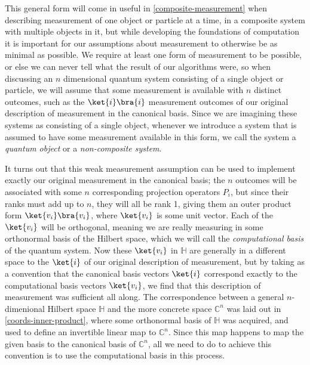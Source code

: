 This general form will come in useful in \autoref{composite-measurement} when describing measurement of one object or particle at a time, in a composite system with multiple objects in it, but while developing the foundations of computation it is important for our assumptions about measurement to otherwise be as minimal as possible. We require at least one form of measurement to be possible, or else we can never tell what the result of our algorithms were, so when discussing an $n$ dimensional quantum system consisting of a single object or particle, we will assume that some measurement is available with $n$ distinct outcomes, such as the $\ket{i}\bra{i}$ measurement outcomes of our original description of measurement in the canonical basis. Since we are imagining these systems as consisting of a single object, whenever we introduce a system that is assumed to have some measurement available in this form, we call the system a \emph{quantum object} or a \emph{non-composite system}.

It turns out that this weak measurement assumption can be used to implement exactly our original measurement in the canonical basis; the $n$ outcomes will be associated with some $n$ corresponding projection operators $P_i$, but since their ranks must add up to $n$, they will all be rank 1, giving them an outer product form $\ket{v_i}\bra{v_i}$, where $\ket{v_i}$ is some unit vector. Each of the $\ket{v_i}$ will be orthogonal, meaning we are really measuring in some orthonormal basis of the Hilbert space, which we will call the \emph{computational basis} of the quantum system. Now these $\ket{v_i}$ in $\mathbb{H}$ are generally in a different space to the $\ket{i}$ of our original description of measurement, but by taking as a convention that the canonical basis vectors $\ket{i}$ correspond exactly to the computational basis vectors $\ket{v_i}$, we find that this description of measurement was sufficient all along. The correspondence between a general $n$-dimenional Hilbert space $\mathbb{H}$ and the more concrete space $\mathbb{C}^n$ was laid out in \autoref{coords-inner-product}, where some orthonormal basis of $\mathbb{H}$ was acquired, and used to define an invertible linear map to $\mathbb{C}^n$. Since this map happens to map the given basis to the canonical basis of $\mathbb{C}^n$, all we need to do to achieve this convention is to use the computational basis in this process.

